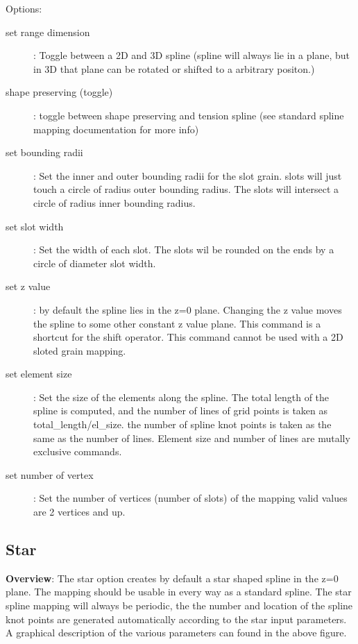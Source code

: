 Options:
\begin{description}
  \item[set range dimension] : Toggle between a 2D and 3D spline (spline will always lie in a plane,
   but in 3D that plane can be rotated or shifted to a arbitrary positon.)
  \item[shape preserving (toggle)] : toggle between shape preserving and tension spline (see standard
   spline mapping documentation for more info)
  \item[set bounding radii] : Set the inner and outer bounding radii for the slot grain.
   slots will just touch a circle of radius outer bounding radius.  The slots will intersect a circle
   of radius inner bounding radius.
  \item[set slot width] : Set the width of each slot.  The slots wil be rounded on the ends by a
    circle of diameter slot width.
  \item[set z value] : by default the spline lies in the z=0 plane.  Changing the z value moves the
   spline to some other constant z value plane.  This command is a shortcut for the shift operator.
   This command cannot be used with a 2D sloted grain mapping.
  \item[set element size] : Set the size of the elements along the spline.  The total length of the
   spline is computed, and the number of lines of grid points is taken as total\_length/el\_size. the
   number of spline knot points is taken as the same as the number of lines.  Element size and
   number of lines are mutally exclusive commands.
  \item[set number of vertex] : Set the number of vertices (number of slots) of the mapping valid
     values are 2 vertices and up.
\end{description}


\subsection{Star}

{\bf Overview}: The star option creates by default a star shaped spline in the z=0 plane.  The
           mapping should be usable in every way as a standard spline.  The star spline mapping will
           always be periodic, the the number and location of the spline knot points are generated 
           automatically according to the star input parameters.  A graphical description of the
           various parameters can found in the above figure.

